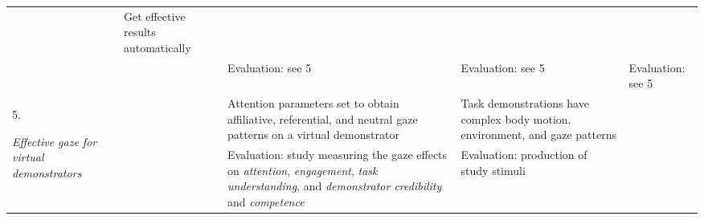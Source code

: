 \begin{sidewaystable}
\begin{tabularx}{\textwidth}{|p{2.7cm}||X|X|X|X|}
& Get effective results automatically \\
& 
& Evaluation: see 5
& Evaluation: see 5
& Evaluation: see 5 \\
\hline
\multirow{2}{*}{5. \parbox{2.5cm}{\emph{Effective gaze for virtual demonstrators}}}
& 
& Attention parameters set to obtain affiliative, referential, and neutral gaze patterns on a virtual demonstrator
& Task demonstrations have complex body motion, environment, and gaze patterns
& \\
& 
& Evaluation: study measuring the gaze effects on \emph{attention}, \emph{engagement}, \emph{task understanding}, and \emph{demonstrator credibility} and \emph{competence}
& Evaluation: production of study stimuli
& \\
\hline
\end{tabularx}
\end{sidewaystable}

